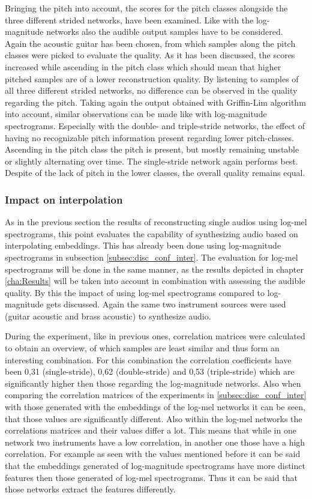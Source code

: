 Bringing the pitch into account, the scores for the pitch classes alongside the three different strided networks, have been examined. Like with the log-magnitude networks also the audible output samples have to be considered. Again the acoustic guitar has been chosen, from which samples along the pitch classes were picked to evaluate the quality. As it has been discussed, the scores increased while ascending in the pitch class which should mean that higher pitched samples are of a lower reconstruction quality. By listening to samples of all three different strided networks, no difference can be observed in the quality regarding the pitch. Taking again the output obtained with Griffin-Lim algorithm into account, similar observations can be made like with log-magnitude spectrograms. Especially with the double- and triple-stride networks, the effect of having no recognizable pitch information present regarding lower pitch-classes. Ascending in the pitch class the pitch is present, but mostly remaining unstable or slightly alternating over time. The single-stride network again performs best. Despite of the lack of pitch in the lower classes, the overall quality remains equal.

\subsubsection{Impact on interpolation}
As in the previous section the results of reconstructing single audios using log-mel spectrograms, this point evaluates the capability of synthesizing audio based on interpolating embeddings. This has already been done using log-magnitude spectrograms in subsection \ref{subsec:disc_conf_inter}. The evaluation for log-mel spectrograms will be done in the same manner, as the results depicted in chapter \ref{cha:Results} will be taken into account in combination with assessing the audible quality. By this the impact of using log-mel spectrograms compared to log-magnitude gets discussed. Again the same two instrument sources were used (guitar acoustic and brass acoustic) to synthesize audio.

During the experiment, like in previous ones, correlation matrices were calculated to obtain an overview, of which samples are least similar and thus form an interesting combination. For this combination the correlation coefficients have been 0,31 (single-stride), 0,62 (double-stride) and 0,53 (triple-stride) which are significantly higher then those regarding the log-magnitude networks. Also when comparing the correlation matrices of the experiments in \ref{subsec:disc_conf_inter} with those generated with the embeddings of the log-mel networks it can be seen, that those values are significantly different. Also within the log-mel networks the correlations matrices and their values differ a lot. This means that while in one network two instruments have a low correlation, in another one those have a high correlation. 
For example as seen with the values mentioned before it can be said that the embeddings generated of log-magnitude spectrograms have more distinct features then those generated of log-mel spectrograms. Thus it can be said that those networks extract the features differently.

